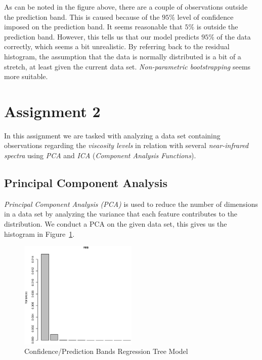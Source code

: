 \documentclass[a4paper, twocolumn]{article}
\begin{document}
        As can be noted in the figure above, there are a couple of observations outside the prediction band. This is caused because of the $95 \%$ level of confidence imposed on the prediction band. It seems reasonable that $5 \%$ is outside the prediction band. However, this tells us that our model predicts $95 \%$ of the data correctly, which seems a bit unrealistic. By referring back to the residual histogram, the assumption that the data is normally distributed is a bit of a stretch, at least given the current data set. \emph{Non-parametric bootstrapping} seems more suitable.


    \section*{Assignment 2}

        In this assignment we are tasked with analyzing a data set containing observations regarding the \emph{viscosity levels} in relation with several \emph{near-infrared spectra} using \emph{PCA} and \emph{ICA} (\emph{Component Analysis Functions}).

    \subsection*{Principal Component Analysis}

        \emph{Principal Component Analysis (PCA)} is used to reduce the number of dimensions in a data set by analyzing the variance that each feature contributes to the distribution. We conduct a PCA on the given data set, this gives us the histogram in Figure~\ref{fig:pcahist}.

        \begin{figure}[h!]
            \centering
            \caption{Confidence/Prediction Bands Regression Tree Model}
            \label{fig:pcahist}
            \includegraphics[width=0.5\textwidth]{share/A2_pcahist.eps}
        \end{figure}
\end{document}
